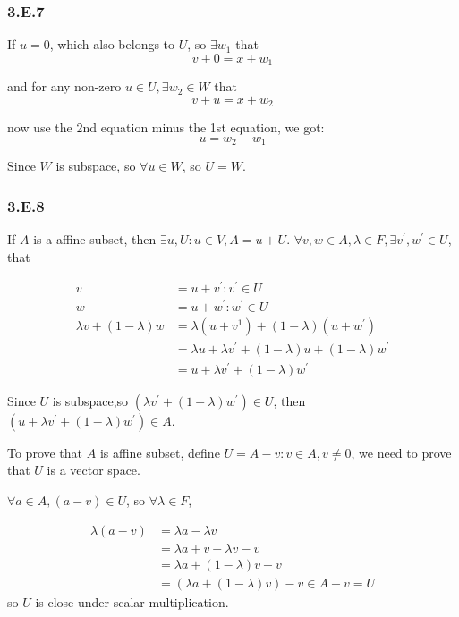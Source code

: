 \subsubsection*{3.E.7}

If $u = 0$, which also belongs to $U$, so $\exists w_{1}$ that 
\[v + 0 = x + w_{1}\]

and for any non-zero $u \in U, \exists w_{2} \in W$ that
\[v + u = x + w_{2}\] 

now use the 2nd equation minus the 1st equation, we got:
\[u = w_{2} - w_{1}\]

Since $W$ is subspace, so $\forall u \in W$, so $U = W$.

\subsubsection*{3.E.8}

If $A$ is a affine subset, then $\exists u, U: u\in V, A = u + U$. $\forall v, w \in A, \lambda \in F, \exists v^{'}, w^{'} \in U$, that

\begin{equation*}
    \begin{split}
    v &= u + v^{'} : v^{'} \in U \\
    w &= u + w^{'} : w^{'} \in U \\
    \lambda v + (1-\lambda)w &= \lambda(u + v^{1}) + (1-\lambda)(u+w^{'}) \\
    &= \lambda u + \lambda v^{'} + (1-\lambda)u + (1-\lambda)w^{'} \\
    &= u + \lambda v^{'} + (1-\lambda)w^{'}
\end{split}
\end{equation*}

Since $U$ is subspace,so $(\lambda v^{'} + (1-\lambda)w^{'}) \in U$, then $(u+\lambda v^{'} + (1-\lambda)w^{'}) \in A$.

To prove that $A$ is affine subset, define $U = {A - v: v\in A, v\neq 0}$, we need to prove that $U$ is a vector space.

$\forall a\in A, (a-v)\in U$, so $\forall \lambda \in F$,

\begin{equation*}
    \begin{split}
    \lambda (a-v) &= \lambda a - \lambda v \\
    &= \lambda a + v - \lambda v -v \\
    & = \lambda a + (1-\lambda)v -v \\
    &= (\lambda a + (1-\lambda)v) - v \in {A-v} = U
\end{split}
\end{equation*}
so $U$ is close under scalar multiplication.

